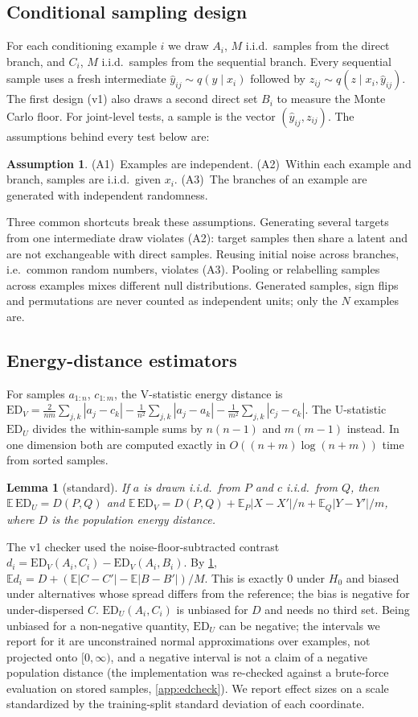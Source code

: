 \documentclass{article}
\theoremstyle{plain}
\newtheorem{lemma}[theorem]{Lemma}
\theoremstyle{definition}
\newtheorem{assumption}[theorem]{Assumption}
\theoremstyle{remark}
\newcommand{\ED}{\mathrm{ED}}
\newcommand{\E}{\mathbb{E}}
\begin{document}
\subsection{Conditional sampling design}
\label{sec:design}

For each conditioning example $i$ we draw $A_i$, $M$ i.i.d.\ samples from the direct branch, and $C_i$, $M$ i.i.d.\ samples from the sequential branch.
Every sequential sample uses a fresh intermediate $\hat y_{ij}\sim q(y\mid x_i)$ followed by $z_{ij}\sim q(z\mid x_i,\hat y_{ij})$.
The first design (v1) also draws a second direct set $B_i$ to measure the Monte Carlo floor. For joint-level tests, a sample is the vector $(\hat y_{ij},z_{ij})$.
The assumptions behind every test below are:
\begin{assumption}
\label{ass:design}
(A1)~Examples are independent. (A2)~Within each example and branch, samples are i.i.d.\ given $x_i$. (A3)~The branches of an example are generated with independent randomness.
\end{assumption}
Three common shortcuts break these assumptions.
Generating several targets from one intermediate draw violates (A2): target samples then share a latent and are not exchangeable with direct samples.
Reusing initial noise across branches, i.e.\ common random numbers, violates (A3).
Pooling or relabelling samples across examples mixes different null distributions.
Generated samples, sign flips and permutations are never counted as independent units; only the $N$ examples are.

\subsection{Energy-distance estimators}
\label{sec:ed}

For samples $a_{1:n}$, $c_{1:m}$, the V-statistic energy distance is $\ED_V=\frac{2}{nm}\sum_{j,k}|a_j-c_k|-\frac{1}{n^2}\sum_{j,k}|a_j-a_k|-\frac{1}{m^2}\sum_{j,k}|c_j-c_k|$. The U-statistic $\ED_U$ divides the within-sample sums by $n(n-1)$ and $m(m-1)$ instead.
In one dimension both are computed exactly in $O((n+m)\log(n+m))$ time from sorted samples.
\begin{lemma}[standard]
\label{lem:vbias}
If $a$ is drawn i.i.d.\ from $P$ and $c$ i.i.d.\ from $Q$, then $\E\,\ED_U=D(P,Q)$ and $\E\,\ED_V=D(P,Q)+\E_P|X-X'|/n+\E_Q|Y-Y'|/m$, where $D$ is the population energy distance.
\end{lemma}
The v1 checker used the noise-floor-subtracted contrast $d_i=\ED_V(A_i,C_i)-\ED_V(A_i,B_i)$.
By \cref{lem:vbias}, $\E d_i=D+(\E|C-C'|-\E|B-B'|)/M$. This is exactly $0$ under $H_0$ and biased under alternatives whose spread differs from the reference; the bias is negative for under-dispersed $C$.
$\ED_U(A_i,C_i)$ is unbiased for $D$ and needs no third set.
Being unbiased for a non-negative quantity, $\ED_U$ can be negative; the intervals we report for it are unconstrained normal approximations over examples, not projected onto $[0,\infty)$, and a negative interval is not a claim of a negative population distance (the implementation was re-checked against a brute-force evaluation on stored samples, \cref{app:edcheck}).
We report effect sizes on a scale standardized by the training-split standard deviation of each coordinate.
\end{document}
